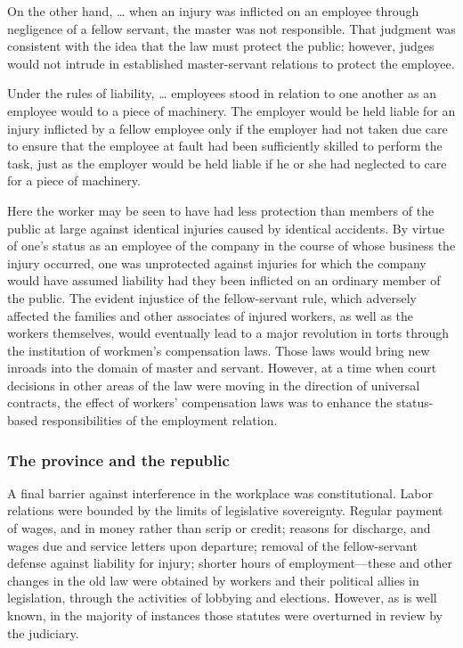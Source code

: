 \documentclass[
  letterpaper,
  11pt,
  DIV=9,
  openright]{scrbook}
\begin{document}
On the other hand, \ldots{} when an injury was inflicted on an employee
through negligence of a fellow servant, the master was not responsible.
That judgment was consistent with the idea that the law must protect the
public; however, judges would not intrude in established master-servant
relations to protect the employee.

Under the rules of liability, \ldots{} employees stood in relation to
one another as an employee would to a piece of machinery. The employer
would be held liable for an injury inflicted by a fellow employee only
if the employer had not taken due care to ensure that the employee at
fault had been sufficiently skilled to perform the task, just as the
employer would be held liable if he or she had neglected to care for a
piece of machinery.

Here the worker may be seen to have had less protection than members of
the public at large against identical injuries caused by identical
accidents. By virtue of one's status as an employee of the company in
the course of whose business the injury occurred, one was unprotected
against injuries for which the company would have assumed liability had
they been inflicted on an ordinary member of the public. The evident
injustice of the fellow-servant rule, which adversely affected the
families and other associates of injured workers, as well as the workers
themselves, would eventually lead to a major revolution in torts through
the institution of workmen's compensation laws. Those laws would bring
new inroads into the domain of master and servant. However, at a time
when court decisions in other areas of the law were moving in the
direction of universal contracts, the effect of workers' compensation
laws was to enhance the status-based responsibilities of the employment
relation.

\subsubsection{The province and the
republic}\label{the-province-and-the-republic}

A final barrier against interference in the workplace was
constitutional. Labor relations were bounded by the limits of
legislative sovereignty. Regular payment of wages, and in money rather
than scrip or credit; reasons for discharge, and wages due and service
letters upon departure; removal of the fellow-servant defense against
liability for injury; shorter hours of employment---these and other
changes in the old law were obtained by workers and their political
allies in legislation, through the activities of lobbying and elections.
However, as is well known, in the majority of instances those statutes
were overturned in review by the judiciary.
\end{document}
